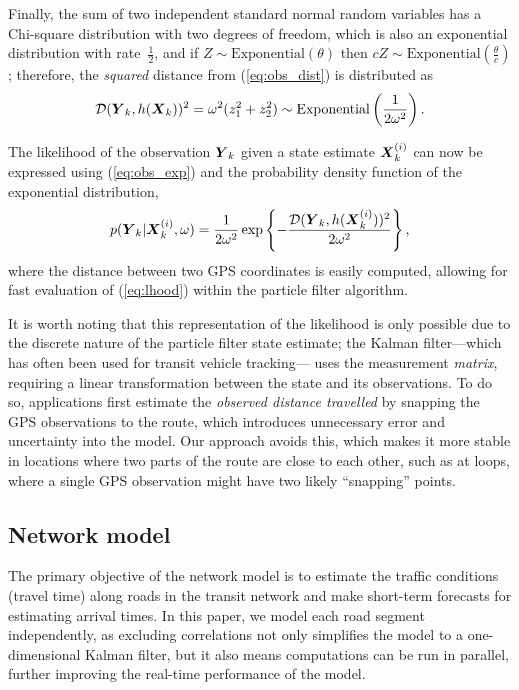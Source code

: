 Finally, the sum of two independent 
standard normal random variables has a Chi-square distribution with two degrees of freedom,
which is also an exponential distribution with rate~$\frac{1}{2}$,
and if $Z \sim \mathrm{Exponential}(\theta)$ then
$cZ \sim \mathrm{Exponential}(\frac{\theta}{c})$;
therefore, the \emph{squared} distance from (\ref{eq:obs_dist}) is distributed as
\begin{equation}
\label{eq:obs_exp}
\mathcal{D}(\mbox{$\boldsymbol{Y}$}_k, h(\mbox{$\boldsymbol{X}$}_k))^2 =
\omega^2(z_1^2 + z_2^2) \sim \mathrm{Exponential}\left(\frac{1}{2\omega^2}\right).
\end{equation}

The likelihood of the observation $\mbox{$\boldsymbol{Y}$}_k$ given a state estimate $\mbox{$\boldsymbol{X}$}_k^{(i)}$
can now be expressed using (\ref{eq:obs_exp}) 
and the probability density function of the exponential distribution,
\begin{equation}
\label{eq:lhood}
p(\mbox{$\boldsymbol{Y}$}_k | \mbox{$\boldsymbol{X}$}_k^{(i)}, \omega) =
\frac{1}{2\omega^2}\exp\left\{
    -\frac{\mathcal{D}(\mbox{$\boldsymbol{Y}$}_k, h(\mbox{$\boldsymbol{X}$}_k^{(i)}))^2}{2\omega^2}
\right\},
\end{equation}
where the distance between two GPS coordinates is easily computed,
allowing for fast evaluation of (\ref{eq:lhood}) within the particle filter algorithm.


It is worth noting that this representation of the likelihood is only
possible due to the discrete nature of the particle filter state estimate;
the Kalman filter---which has often been used for transit vehicle tracking---%
uses the measurement \emph{matrix}, requiring a linear
transformation between the state and its observations.
To do so, applications first estimate the \emph{observed distance travelled}
by snapping the GPS observations to the route,
which introduces unnecessary error and uncertainty into the model.
Our approach avoids this, which makes it more stable in locations where two 
parts of the route are close to each other,
such as at loops, where a single GPS observation might have two likely ``snapping'' points.


\subsection{Network model}
\label{sec:kf}

The primary objective of the network model is to estimate the \rt traffic conditions
(travel time) along roads in the transit network
and make short-term forecasts for estimating arrival times.
In this paper, we model each road segment independently,
as excluding correlations not only simplifies the model to a one-dimensional Kalman filter,
but it also means computations can be run in parallel,
further improving the real-time performance of the model.


